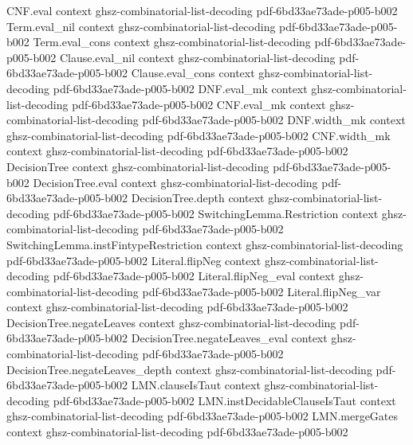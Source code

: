 \begin{lemma}
\proofstep
  {CNF.eval}
  {context}
  {ghsz-combinatorial-list-decoding}
  {pdf-6bd33ae73ade-p005-b002}
\proofstep
  {Term.eval_nil}
  {context}
  {ghsz-combinatorial-list-decoding}
  {pdf-6bd33ae73ade-p005-b002}
\proofstep
  {Term.eval_cons}
  {context}
  {ghsz-combinatorial-list-decoding}
  {pdf-6bd33ae73ade-p005-b002}
\proofstep
  {Clause.eval_nil}
  {context}
  {ghsz-combinatorial-list-decoding}
  {pdf-6bd33ae73ade-p005-b002}
\proofstep
  {Clause.eval_cons}
  {context}
  {ghsz-combinatorial-list-decoding}
  {pdf-6bd33ae73ade-p005-b002}
\proofstep
  {DNF.eval_mk}
  {context}
  {ghsz-combinatorial-list-decoding}
  {pdf-6bd33ae73ade-p005-b002}
\proofstep
  {CNF.eval_mk}
  {context}
  {ghsz-combinatorial-list-decoding}
  {pdf-6bd33ae73ade-p005-b002}
\proofstep
  {DNF.width_mk}
  {context}
  {ghsz-combinatorial-list-decoding}
  {pdf-6bd33ae73ade-p005-b002}
\proofstep
  {CNF.width_mk}
  {context}
  {ghsz-combinatorial-list-decoding}
  {pdf-6bd33ae73ade-p005-b002}
\proofstep
  {DecisionTree}
  {context}
  {ghsz-combinatorial-list-decoding}
  {pdf-6bd33ae73ade-p005-b002}
\proofstep
  {DecisionTree.eval}
  {context}
  {ghsz-combinatorial-list-decoding}
  {pdf-6bd33ae73ade-p005-b002}
\proofstep
  {DecisionTree.depth}
  {context}
  {ghsz-combinatorial-list-decoding}
  {pdf-6bd33ae73ade-p005-b002}
\proofstep
  {SwitchingLemma.Restriction}
  {context}
  {ghsz-combinatorial-list-decoding}
  {pdf-6bd33ae73ade-p005-b002}
\proofstep
  {SwitchingLemma.instFintypeRestriction}
  {context}
  {ghsz-combinatorial-list-decoding}
  {pdf-6bd33ae73ade-p005-b002}
\proofstep
  {Literal.flipNeg}
  {context}
  {ghsz-combinatorial-list-decoding}
  {pdf-6bd33ae73ade-p005-b002}
\proofstep
  {Literal.flipNeg_eval}
  {context}
  {ghsz-combinatorial-list-decoding}
  {pdf-6bd33ae73ade-p005-b002}
\proofstep
  {Literal.flipNeg_var}
  {context}
  {ghsz-combinatorial-list-decoding}
  {pdf-6bd33ae73ade-p005-b002}
\proofstep
  {DecisionTree.negateLeaves}
  {context}
  {ghsz-combinatorial-list-decoding}
  {pdf-6bd33ae73ade-p005-b002}
\proofstep
  {DecisionTree.negateLeaves_eval}
  {context}
  {ghsz-combinatorial-list-decoding}
  {pdf-6bd33ae73ade-p005-b002}
\proofstep
  {DecisionTree.negateLeaves_depth}
  {context}
  {ghsz-combinatorial-list-decoding}
  {pdf-6bd33ae73ade-p005-b002}
\proofstep
  {LMN.clauseIsTaut}
  {context}
  {ghsz-combinatorial-list-decoding}
  {pdf-6bd33ae73ade-p005-b002}
\proofstep
  {LMN.instDecidableClauseIsTaut}
  {context}
  {ghsz-combinatorial-list-decoding}
  {pdf-6bd33ae73ade-p005-b002}
\proofstep
  {LMN.mergeGates}
  {context}
  {ghsz-combinatorial-list-decoding}
  {pdf-6bd33ae73ade-p005-b002}

\end{lemma}
